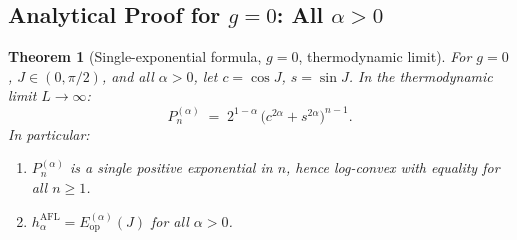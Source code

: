 \documentclass[12pt,a4paper]{article}
\newtheorem{theorem}{Theorem}[section]
\begin{document}
\subsection{Analytical Proof for $g=0$: All $\alpha>0$}
\label{sec:g0_allalpha}

\begin{theorem}[Single-exponential formula, $g=0$, thermodynamic limit]
\label{thm:single_exp_g0}
For $g=0$, $J\in(0,\pi/2)$, and all $\alpha>0$, let $c=\cos J$, $s=\sin J$.
In the thermodynamic limit $L\to\infty$:
\begin{equation}
\label{eq:single_exp}
  \boxed{P_n^{(\alpha)} \;=\; 2^{1-\alpha}\,\bigl(c^{2\alpha}+s^{2\alpha}\bigr)^{n-1}.}
\end{equation}
In particular:
\begin{enumerate}
\item $P_n^{(\alpha)}$ is a \emph{single} positive exponential in $n$, hence log-convex
  \emph{with equality} for all $n\geq 1$.
\item $h_\alpha^{\mathrm{AFL}} = E_{\mathrm{op}}^{(\alpha)}(J)$ for all $\alpha>0$.
\end{enumerate}
\end{theorem}
\end{document}
